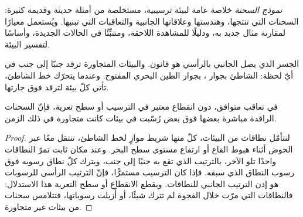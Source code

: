 \begin{definition}\label{def:b3:facies-models:model}
\emph{نموذج السحنة} خلاصة عامة لبيئة ترسيبية،
مستخلصة من أمثلة حديثة وقديمة كثيرة: السحنات التي تنتجها،
وهندستها وعلاقاتها الجانبية والتعاقبات التي تبنيها.
ويُستعمل معيارًا لمقارنة مثال جديد به، ودليلًا
للمشاهدة اللاحقة، ومتنبِّئًا في الحالات الجديدة، وأساسًا
لتفسير البيئة.
\end{definition}

الجسر الذي يصل الجانبي بالرأسي هو قانون. والبيئات المتجاورة
ترقد جنبًا إلى جنب في أيّ لحظة: الشاطئ بجوار ،
 بجوار الطين البحري المفتوح. وعندما يتحرّك خط الشاطئ،
تأتي كلّ بيئة لترقد فوق جارتها.

\begin{theorem}\label{thm:b3:facies-models:walther}
في تعاقب متوافق، دون انقطاع معتبر في الترسيب أو
سطح تعرية، فإنّ السحنات الراقدة مباشرة بعضها فوق بعض رُسّبت
في بيئات كانت متجاورة في ذلك الزمن.
\end{theorem}

\begin{proof}
لنتأمّل نطاقات من البيئات، كلّ منها شريط موازٍ لخط الشاطئ، تنتقل معًا
عبر الحوض أثناء هبوط القاع أو ارتفاع مستوى سطح البحر.
وعند مكان ثابت تمرّ النطاقات واحدًا تلو الآخر، بالترتيب الذي تقع به جنبًا إلى جنب،
ويترك كلّ نطاق رسوبه فوق رسوب النطاق الذي سبقه.
فإذا كان الترسيب مستمرًّا، فإنّ الترتيب الرأسي للرسوبات
هو إذن الترتيب الجانبي للنطاقات.
ويقطع الانقطاع أو سطح التعرية هذا الاستدلال:
فالنطاقات التي مرّت خلال الفجوة لم تترك شيئًا، أو أُزيلت رسوباتها،
فتتلامس سحنات من بيئات غير متجاورة.
\end{proof}

